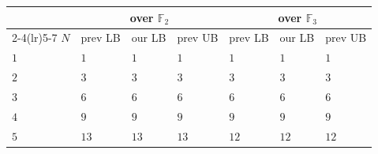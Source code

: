 \documentclass[11pt]{article}
\theoremstyle{definition}
\newcommand{\F}{\mathbb{F}}
\begin{document}
\begin{table}[!ht]
  \centering
  \setlength{\tabcolsep}{6pt}
  \begin{tabular}{lllllll}
    \toprule
    & \multicolumn{3}{c}{over $\F_2$}                                               & \multicolumn{3}{c}{over $\F_3$}                                                                                                                                                                                       \\
    \cmidrule(lr){2-4}\cmidrule(lr){5-7}
    $N$ & prev LB                                                                       & our LB                          & prev UB                                      & prev LB                                                                      & our LB       & prev UB                                \\
    \midrule
    $1$ & $1$                                                                           & $1$                             & $1$                                          & $1$                                                                          & $1$          & $1$                                    \\
    $2$ & $3$~\cite{fiduccia1977algebras}                                               & $3$                             & $3$~\cite{toom1963complexity}                & $3$~\cite{fiduccia1977algebras}                                              & $3$          & $3$~\cite{toom1963complexity}          \\
    $3$ & $6$~\cite{lempel1977new,brockett1978optimal,griesmer1960bound}     & $6$                             & $6$~\cite{kaminski1989multiplicative}        & $6$~\cite{lempel1977new,brockett1978optimal,grassl2007codetables} & $6$          & $6$~\cite{kaminski1989multiplicative}  \\
    $4$ & $9$~\cite{kaminski1989multiplicative}                                         & $9$                             & $9$~\cite{kaminski1989multiplicative}        & $9$~\cite{kaminski1989multiplicative}                                        & $9$          & $9$~\cite{kaminski1989multiplicative}  \\
    $5$ & $13$~\cite{lempel1977new,brockett1978optimal,grassl2007codetables} & $13$                            & $13$~\cite{montgomery2005five}               & $12$~\cite{kaminski1989multiplicative}                                       & $12$         & $12$~\cite{kaminski1989multiplicative} \\

\end{tabular}
\end{table}
\end{document}
